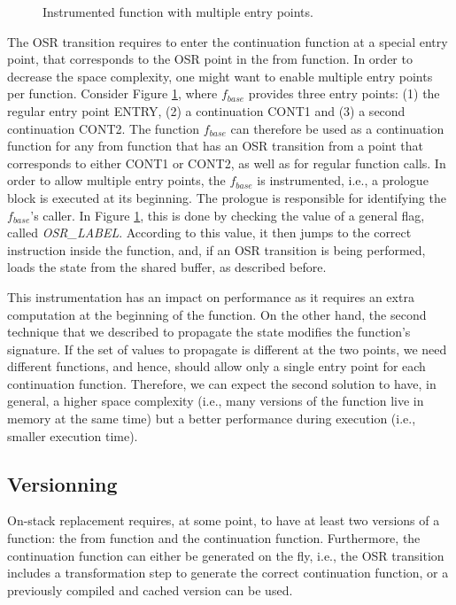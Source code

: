 \begin{figure}[h!]
\centering
\begin{subfigure}{.8\textwidth}
\end{subfigure}
\caption{Instrumented function with multiple entry points.}
\label{fig:multipleentry}
\end{figure}

The OSR transition requires to enter the continuation function at a special entry point, that corresponds to the OSR point in the from function.
In order to decrease the space complexity, one might want to enable multiple entry points per function.
Consider Figure \ref{fig:multipleentry}, where $f_{base}$ provides three entry points: (1) the regular entry point ENTRY, (2) a continuation CONT1 and (3) a second continuation CONT2.
The function $f_{base}$ can therefore be used as a continuation function for any from function that has an OSR transition from a point that corresponds to either CONT1 or CONT2, as well as for regular function calls.
In order to allow multiple entry points, the $f_{base}$ is instrumented, i.e., a prologue block is executed at its beginning.
The prologue is responsible for identifying the $f_{base}$'s caller. 
In Figure \ref{fig:multipleentry}, this is done by checking the value of a general flag, called \textit{OSR\_LABEL}.
According to this value, it then jumps to the correct instruction inside the function, and, if an OSR transition is being performed, loads the state from the shared buffer, as described before.

This instrumentation has an impact on performance as it requires an extra computation at the beginning of the function. 
On the other hand, the second technique that we described to propagate the state modifies the function's signature.
If the set of values to propagate is different at the two points, we need different functions, and hence, should allow only a single entry point for each continuation function.
Therefore, we can expect the second solution to have, in general, a higher space complexity (i.e., many versions of the function live in memory at the same time) but a better performance during execution (i.e., smaller execution time).\\

\subsection{Versionning}
On-stack replacement requires, at some point, to have at least two versions of a function: the from function and the continuation function.
Furthermore, the continuation function can either be generated on the fly, i.e., the OSR transition includes a transformation step to generate the correct continuation function, or a previously compiled and cached version can be used.

